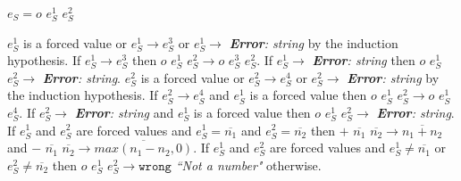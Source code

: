 \begin{case}
$e_{S}=o$ $e_{S}^{1}$ $e_{S}^{2}$

$e_{S}^{1}$ is a forced value or $e_{S}^{1}\rightarrow e_{S}^{3}$ or $e_{S}^{1}\rightarrow$ \emph{\textbf{Error}: string} by the induction hypothesis.  If $e_{S}^{1}\rightarrow e_{S}^{3}$ then $o$ $e_{S}^{1}$ $e_{S}^{2}\rightarrow o$ $e_{S}^{3}$ $e_{S}^{2}$.  If $e_{S}^{1}\rightarrow$ \emph{\textbf{Error}: string} then $o$ $e_{S}^{1}$ $e_{S}^{2}\rightarrow$ \emph{\textbf{Error}: string}.  $e_{S}^{2}$ is a forced value or $e_{S}^{2}\rightarrow e_{S}^{4}$ or $e_{S}^{2}\rightarrow$ \emph{\textbf{Error}: string} by the induction hypothesis.  If $e_{S}^{2}\rightarrow e_{S}^{4}$ and $e_{S}^{1}$ is a forced value then $o$ $e_{S}^{1}$ $e_{S}^{2}\rightarrow o$ $e_{S}^{1}$ $e_{S}^{4}$.  If $e_{S}^{2}\rightarrow$ \emph{\textbf{Error}: string} and $e_{S}^{1}$ is a forced value then $o$ $e_{S}^{1}$ $e_{S}^{2}\rightarrow$ \emph{\textbf{Error}: string}.  If $e_{S}^{1}$ and $e_{S}^{2}$ are forced values and $e_{S}^{1}=\overline{n_{1}}$ and $e_{S}^{2}=\overline{n_{2}}$ then $+$ $\overline{n_{1}}$ $\overline{n_{2}}\rightarrow\overline{n_{1}+n_{2}}$ and $-$ $\overline{n_{1}}$ $\overline{n_{2}}\rightarrow\overline{max(n_{1}-n_{2},0)}$.  If $e_{S}^{1}$ and $e_{S}^{2}$ are forced values and $e_{S}^{1}\neq\overline{n_{1}}$ or $e_{S}^{2}\neq\overline{n_{2}}$ then $o$ $e_{S}^{1}$ $e_{S}^{2}\rightarrow\mathtt{wrong}$ \emph{``Not a number"} otherwise.
\end{case}